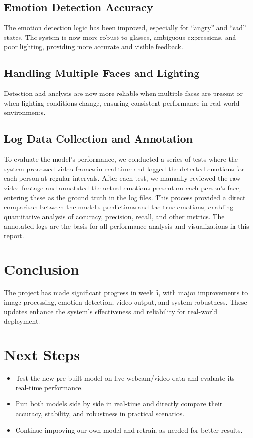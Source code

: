 \documentclass[12pt]{article}
\begin{document}
\subsection{Emotion Detection Accuracy}
The emotion detection logic has been improved, especially for ``angry'' and ``sad'' states. The system is now more robust to glasses, ambiguous expressions, and poor lighting, providing more accurate and visible feedback.

\subsection{Handling Multiple Faces and Lighting}
Detection and analysis are now more reliable when multiple faces are present or when lighting conditions change, ensuring consistent performance in real-world environments.

\subsection{Log Data Collection and Annotation}
To evaluate the model's performance, we conducted a series of tests where the system processed video frames in real time and logged the detected emotions for each person at regular intervals. After each test, we manually reviewed the raw video footage and annotated the actual emotions present on each person's face, entering these as the ground truth in the log files. This process provided a direct comparison between the model's predictions and the true emotions, enabling quantitative analysis of accuracy, precision, recall, and other metrics. The annotated logs are the basis for all performance analysis and visualizations in this report.

\section{Conclusion}
The project has made significant progress in week 5, with major improvements to image processing, emotion detection, video output, and system robustness. These updates enhance the system's effectiveness and reliability for real-world deployment.

\section{Next Steps}
\begin{itemize}
    \item Test the new pre-built model on live webcam/video data and evaluate its real-time performance.
    \item Run both models side by side in real-time and directly compare their accuracy, stability, and robustness in practical scenarios.
    \item Continue improving our own model and retrain as needed for better results.
\end{itemize}
\end{document}
